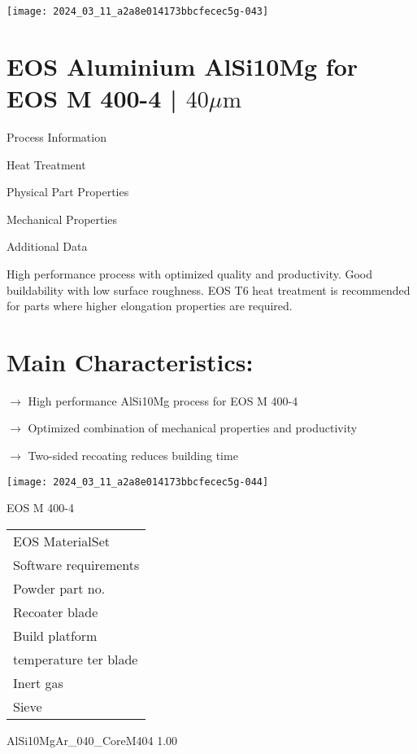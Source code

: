 \documentclass[10pt]{article}
\begin{document}
\begin{center}
\texttt{[image: 2024\_03\_11\_a2a8e014173bbcfecec5g-043]}
\end{center}

\section*{EOS Aluminium AlSi10Mg for EOS M 400-4 | $40 \mu \mathrm{m}$}
Process Information

Heat Treatment

Physical Part Properties

Mechanical Properties

Additional Data

High performance process with optimized quality and productivity. Good buildability with low surface roughness. EOS T6 heat treatment is recommended for parts where higher elongation properties are required.

\section*{Main Characteristics:}
$\longrightarrow$ High performance AlSi10Mg process for EOS M 400-4

$\longrightarrow$ Optimized combination of mechanical properties and productivity

$\longrightarrow$ Two-sided recoating reduces building time

\begin{center}
\texttt{[image: 2024\_03\_11\_a2a8e014173bbcfecec5g-044]}
\end{center}

EOS M 400-4

\begin{center}
\begin{tabular}{l}
EOS MaterialSet \\
Software requirements \\
Powder part no. \\
Recoater blade \\
Build platform \\
temperature ter blade \\
Inert gas \\
Sieve \\
\hline
\end{tabular}
\end{center}

AlSi10MgAr\_040\_CoreM404 1.00
\end{document}
